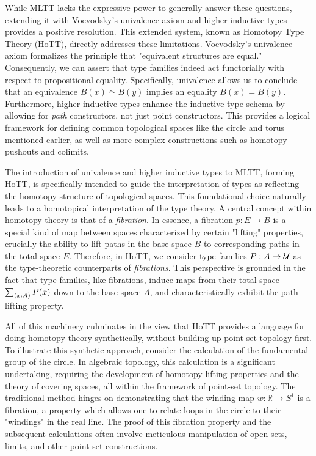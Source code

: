 \documentclass[main.tex]{subfiles}
\begin{document}
While MLTT lacks the expressive power to generally answer these questions, extending it with Voevodsky's univalence axiom and higher inductive types provides a positive resolution. This extended system, known as Homotopy Type Theory (HoTT), directly addresses these limitations. Voevodsky's univalence axiom formalizes the principle that "equivalent structures are equal." Consequently, we can assert that type families indeed act functorially with respect to propositional equality. Specifically, univalence allows us to conclude that an equivalence $B(x) \simeq B(y)$ implies an equality $B(x) = B(y)$. Furthermore, higher inductive types enhance the inductive type schema by allowing for \textit{path} constructors, not just point constructors. This provides a logical framework for defining common topological spaces like the circle and torus mentioned earlier, as well as more complex constructions such as homotopy pushouts and colimits.

The introduction of univalence and higher inductive types to MLTT, forming HoTT, is specifically intended to guide the interpretation of types as reflecting the homotopy structure of topological spaces. This foundational choice naturally leads to a homotopical interpretation of the type theory. A central concept within homotopy theory is that of a \textit{fibration}. In essence, a fibration $p : E \to B$ is a special kind of map between spaces characterized by certain "lifting" properties, crucially the ability to lift paths in the base space $B$ to corresponding paths in the total space $E$. Therefore, in HoTT, we consider type families $P : A \to \mathcal{U}$ as the type-theoretic counterparts of \textit{fibrations}. This perspective is grounded in the fact that type families, like fibrations, induce maps from their total space $\sm{x:A}P(x)$ down to the base space $A$, and characteristically exhibit the path lifting property.

All of this machinery culminates in the view that HoTT provides a language for doing homotopy theory synthetically, without building up point-set topology first. To illustrate this synthetic approach, consider the calculation of the fundamental group of the circle. In algebraic topology, this calculation is a significant undertaking, requiring the development of homotopy lifting properties and the theory of covering spaces, all within the framework of point-set topology. The traditional method hinges on demonstrating that the winding map  $w : \mathbb{R} \to S^1$ is a fibration, a property which allows one to relate loops in the circle to their "windings" in the real line. The proof of this fibration property and the subsequent calculations often involve meticulous manipulation of open sets, limits, and other point-set constructions.
\end{document}
